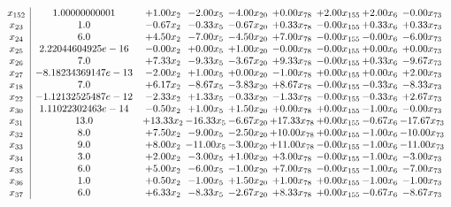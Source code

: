 \documentclass[8pt]{article}
\begin{document}
\[\begin{array}{c| c c@{\hskip 2pt} c@{\hskip 2pt} c@{\hskip 2pt} c@{\hskip 2pt} c@{\hskip 2pt} c@{\hskip 2pt} c@{\hskip 2pt} }
 x_{152}   &  1.00000000001 & +  1.00 x_{2} & -2.00 x_{5} & -4.00 x_{20} & +  0.00 x_{78} & +  2.00 x_{155} & +  2.00 x_{6} & -0.00 x_{73}\\
 x_{23}   &  1.0 & -0.67 x_{2} & -0.33 x_{5} & -0.67 x_{20} & +  0.33 x_{78} & -0.00 x_{155} & +  0.33 x_{6} & +  0.33 x_{73}\\
 x_{24}   &  6.0 & +  4.50 x_{2} & -7.00 x_{5} & -4.50 x_{20} & +  7.00 x_{78} & -0.00 x_{155} & -0.00 x_{6} & -6.00 x_{73}\\
 x_{25}   &  2.22044604925e-16 & -0.00 x_{2} & +  0.00 x_{5} & +  1.00 x_{20} & -0.00 x_{78} & -0.00 x_{155} & +  0.00 x_{6} & +  0.00 x_{73}\\
 x_{26}   &  7.0 & +  7.33 x_{2} & -9.33 x_{5} & -3.67 x_{20} & +  9.33 x_{78} & -0.00 x_{155} & +  0.33 x_{6} & -9.67 x_{73}\\
 x_{27}   &  -8.18234369147e-13 & -2.00 x_{2} & +  1.00 x_{5} & +  0.00 x_{20} & -1.00 x_{78} & +  0.00 x_{155} & +  0.00 x_{6} & +  2.00 x_{73}\\
 x_{18}   &  7.0 & +  6.17 x_{2} & -8.67 x_{5} & -3.83 x_{20} & +  8.67 x_{78} & -0.00 x_{155} & -0.33 x_{6} & -8.33 x_{73}\\
 x_{22}   &  -1.12132525487e-12 & -2.33 x_{2} & +  1.33 x_{5} & -0.33 x_{20} & -1.33 x_{78} & -0.00 x_{155} & -0.33 x_{6} & +  2.67 x_{73}\\
 x_{30}   &  1.11022302463e-14 & -0.50 x_{2} & +  1.00 x_{5} & +  1.50 x_{20} & +  0.00 x_{78} & +  0.00 x_{155} & -1.00 x_{6} & -0.00 x_{73}\\
 x_{31}   &  13.0 & + 13.33 x_{2} & -16.33 x_{5} & -6.67 x_{20} & + 17.33 x_{78} & +  0.00 x_{155} & -0.67 x_{6} & -17.67 x_{73}\\
 x_{32}   &  8.0 & +  7.50 x_{2} & -9.00 x_{5} & -2.50 x_{20} & + 10.00 x_{78} & +  0.00 x_{155} & -1.00 x_{6} & -10.00 x_{73}\\
 x_{33}   &  9.0 & +  8.00 x_{2} & -11.00 x_{5} & -3.00 x_{20} & + 11.00 x_{78} & -0.00 x_{155} & -1.00 x_{6} & -11.00 x_{73}\\
 x_{34}   &  3.0 & +  2.00 x_{2} & -3.00 x_{5} & +  1.00 x_{20} & +  3.00 x_{78} & -0.00 x_{155} & -1.00 x_{6} & -3.00 x_{73}\\
 x_{35}   &  6.0 & +  5.00 x_{2} & -6.00 x_{5} & -1.00 x_{20} & +  7.00 x_{78} & -0.00 x_{155} & -1.00 x_{6} & -7.00 x_{73}\\
 x_{36}   &  1.0 & +  0.50 x_{2} & -1.00 x_{5} & +  1.50 x_{20} & +  1.00 x_{78} & +  0.00 x_{155} & -1.00 x_{6} & -1.00 x_{73}\\
 x_{37}   &  6.0 & +  6.33 x_{2} & -8.33 x_{5} & -2.67 x_{20} & +  8.33 x_{78} & +  0.00 x_{155} & -0.67 x_{6} & -8.67 x_{73}\\

\end{array}\]
\end{document}
